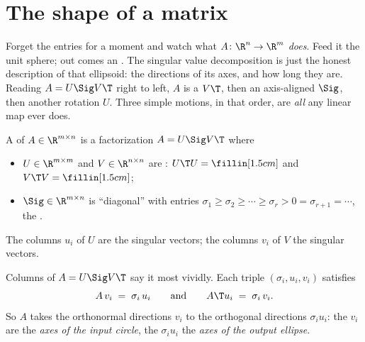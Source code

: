 \section{The shape of a matrix}\label{sec:geometry}
\quad{}

\begin{strand}
Forget the entries for a moment and watch what $A\colon\R^n\to\R^m$ \emph{does}. Feed it the
unit sphere; out comes an . The singular value decomposition is just the
honest description of that ellipsoid: the directions of its axes, and how long they are.
Reading $A=U\Sig V\T$ right to left, $A$ is a  $V\T$, then an axis-aligned
 $\Sig$, then another rotation $U$. Three simple motions, in that order, are
\emph{all} any linear map ever does.
\end{strand}


\begin{definition}\label{def:svd}
A  of $A\in\R^{m\times n}$ is a factorization
$A=U\Sig V\T$ where
\begin{itemize}[leftmargin=2em,itemsep=1pt]
  \item $U\in\R^{m\times m}$ and $V\in\R^{n\times n}$ are :
        $U\T U=\fillin[1.5cm]$ and $V\T V=\fillin[1.5cm]$;
  \item $\Sig\in\R^{m\times n}$ is ``diagonal'' with entries
        $\sigma_1\ge\sigma_2\ge\cdots\ge\sigma_r>0=\sigma_{r+1}=\cdots$, the .
\end{itemize}
The columns $u_i$ of $U$ are the  singular vectors; the columns $v_i$ of $V$ the
 singular vectors.
\end{definition}


Columns of $A=U\Sig V\T$ say it most vividly. Each triple $(\sigma_i,u_i,v_i)$ satisfies
\[
  A\,v_i \;=\; \sigma_i\,u_i \qquad\text{and}\qquad A\T u_i \;=\; \sigma_i\,v_i .
\]
So $A$ takes the orthonormal directions $v_i$ to the orthogonal directions $\sigma_i u_i$:
the $v_i$ are the \emph{axes of the input circle}, the $\sigma_i u_i$ the \emph{axes of the
output ellipse}.

